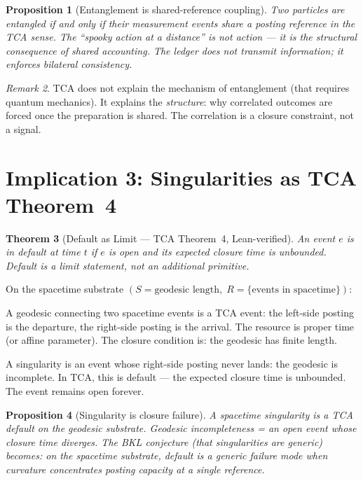 \documentclass[11pt]{article}
\newtheorem{theorem}{Theorem}
\newtheorem{proposition}[theorem]{Proposition}
\theoremstyle{definition}
\theoremstyle{remark}
\newtheorem{remark}[theorem]{Remark}
\begin{document}
\begin{proposition}[Entanglement is shared-reference coupling]
Two particles are entangled if and only if their measurement events
share a posting reference in the TCA sense. The ``spooky action at
a distance'' is not action --- it is the structural consequence of
shared accounting. The ledger does not transmit information; it
enforces bilateral consistency.
\end{proposition}

\begin{remark}
TCA does not explain the mechanism of entanglement (that requires
quantum mechanics). It explains the \emph{structure}: why correlated
outcomes are forced once the preparation is shared. The correlation
is a closure constraint, not a signal.
\end{remark}

\section{Implication 3: Singularities as TCA Theorem~4}

\begin{theorem}[Default as Limit --- TCA Theorem~4, Lean-verified]
An event $e$ is in default at time $t$ if $e$ is open and its
expected closure time is unbounded. Default is a limit statement,
not an additional primitive.
\end{theorem}

On the spacetime substrate $(S = \text{geodesic length},\;
R = \{\text{events in spacetime}\})$:

A geodesic connecting two spacetime events is a TCA event: the
left-side posting is the departure, the right-side posting is the
arrival. The resource is proper time (or affine parameter). The
closure condition is: the geodesic has finite length.

A singularity is an event whose right-side posting never lands:
the geodesic is incomplete. In TCA, this is default --- the expected
closure time is unbounded. The event remains open forever.

\begin{proposition}[Singularity is closure failure]
A spacetime singularity is a TCA default on the geodesic substrate.
Geodesic incompleteness = an open event whose closure time diverges.
The BKL conjecture (that singularities are generic) becomes: on the
spacetime substrate, default is a generic failure mode when curvature
concentrates posting capacity at a single reference.
\end{proposition}
\end{document}
